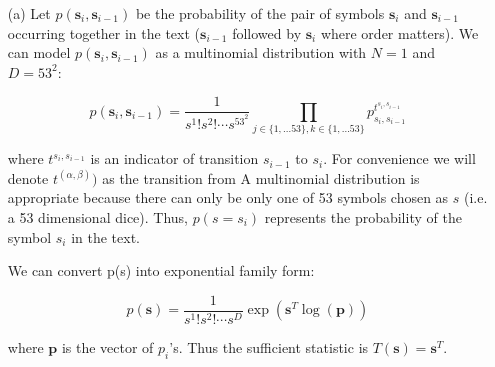 \documentclass[12pt]{article}
\begin{document}
\begin{enumerate}

%
%
%
%


\item[(a)] Let $p(\textbf{s}_i,\textbf{s}_{i-1})$ be the probability of the pair of symbols $\textbf{s}_i$ and $\textbf{s}_{i-1}$ occurring together in the text ($\textbf{s}_{i-1}$ followed by $\textbf{s}_i$ where order matters).
We can model $p(\textbf{s}_i,\textbf{s}_{i-1})$ as a multinomial distribution with $N=1$ and $D=53^2$:

$$p(\textbf{s}_i,\textbf{s}_{i-1}) = \frac{1}{s^1! s^2! \cdots s^{53^2}} \prod_{j \in \{1,...53\}, k \in \{1,...53\}} p_{s_i, s_{i-1}}^{t^{s_i, s_{i-1}}}$$

where $t^{s_i, s_{i-1}}$ is an indicator of transition $s_{i-1}$ to $s_i$.
For convenience we will denote $t^{(\alpha, \beta)})$ as the transition from
A multinomial distribution is appropriate because there can only be only one of 53 symbols chosen as $s$ (i.e. a 53 dimensional dice).
Thus, $p(s=s_i)$ represents the probability of the symbol $s_i$ in the text.

We can convert p(s) into exponential family form:

$$p(\textbf{s}) = \frac{1}{s^1! s^2! \cdots s^D} \exp{(\textbf{s}^T \log(\textbf{p}))}$$

where $\textbf{p}$ is the vector of $p_i$'s.
Thus the sufficient statistic is $T(\textbf{s}) = \textbf{s}^T$.


\end{enumerate}
\end{document}
